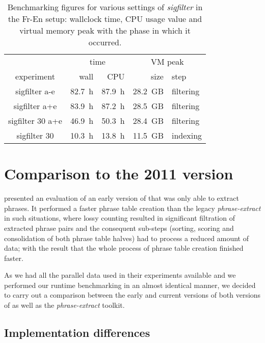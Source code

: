 \begin{table}[ht]
\centering
\begin{tabular}{ | c | r r | r l | }
\hline
 & \multicolumn{2}{|c|}{time} & \multicolumn{2}{|c|}{VM peak} \\
experiment & wall & CPU & size & step \\
\hline
\hline
sigfilter a-e     & 82.7~h & 87.9~h & 28.2~GB & filtering \\
sigfilter a+e     & 83.9~h & 87.2~h & 28.5~GB & filtering \\
sigfilter 30 a+e  & 46.9~h & 50.3~h & 28.4~GB & filtering \\
sigfilter 30      & 10.3~h & 13.8~h & 11.5~GB & indexing \\
\hline
\end{tabular}
\caption{\label{fr-en-sigfilter-runtime-benchmarks}
Benchmarking figures for various settings of \emph{sigfilter} in the Fr-En setup:
wallclock time, CPU usage value and virtual memory peak with the phase in which it occurred.}
\end{table}

\section{Comparison to the 2011 version}
\label{sec:cu-bojar-results}

\citet{przywara:eppex} presented an evaluation of an early version of \eppex{}
that was only able to extract phrases. It performed a faster phrase
table creation than the legacy \emph{phrase-extract} in such situations,
where lossy counting resulted in significant filtration of extracted phrase
pairs and the consequent sub-steps (sorting, scoring and consolidation of both
phrase table halves) had to process a reduced amount of data;
with the result that the whole process of phrase table creation finished faster.

As we had all the parallel data used in their experiments available and
we performed our runtime benchmarking in an almost identical manner,
we decided to carry out a comparison between the early and current versions of
both versions of \eppex{} as well as the \emph{phrase-extract} toolkit.

\subsection{Implementation differences}

